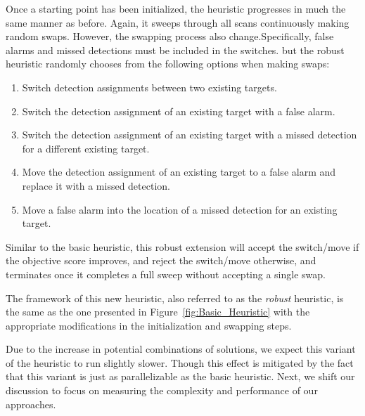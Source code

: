 Once a starting point has been initialized, the heuristic progresses in much the same manner as before. Again, it sweeps through all scans continuously making random swaps. However, the swapping process also change.Specifically, false alarms and missed detections must be included in the switches. but the robust heuristic randomly chooses from the following options when making swaps: 
\begin{enumerate}
  \item Switch detection assignments between two existing targets.
  \item Switch the detection assignment of an existing target with a false alarm.
  \item Switch the detection assignment of an existing target with a missed detection for a different existing target.
  \item Move the detection assignment of an existing target to a false alarm and replace it with a missed detection.
  \item Move a false alarm into the location of a missed detection for an existing target.
\end{enumerate}

Similar to the basic heuristic, this robust extension will accept the switch/move if the objective score improves, and reject the switch/move otherwise, and terminates once it completes a full sweep without accepting a single swap.

The framework of this new heuristic, also referred to as the \textit{robust} heuristic, is the same as the one presented in Figure~\ref{fig:Basic_Heuristic} with the appropriate modifications in the initialization and swapping steps. 

Due to the increase in potential combinations of solutions, we expect this variant of the heuristic to run slightly slower. Though this effect is mitigated by the fact that this variant is just as parallelizable as the basic heuristic. Next, we shift our discussion to focus on measuring the complexity and performance of our approaches. 